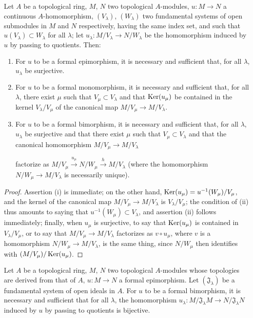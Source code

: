 \begin{proposition}[19.1.3]
\label{0.19.1.3}
Let $A$ be a topological ring, $M$, $N$ two topological $A$-modules, $u:M\to N$ a continuous $A$-homomorphism, $(V_\lambda)$, $(W_\lambda)$ two fundamental systems of open submodules in $M$ and $N$ respectively, having the same index set, and such that $u(V_\lambda)\subset W_\lambda$ for all $\lambda$;
let $u_\lambda:M/V_\lambda\to N/W_\lambda$ be the homomorphism induced by $u$ by passing to quotients.
Then:
\begin{enumerate}
  \item[(i)] For $u$ to be a formal epimorphism, it is necessary and sufficient that, for all $\lambda$, $u_\lambda$ be surjective.
  \item[(ii)] For $u$ to be a formal monomorphism, it is necessary and sufficient that, for all $\lambda$, there exist $\mu$ such that $V_\mu\subset V_\lambda$ and that $\operatorname{Ker}(u_\mu)$ be contained in the kernel $V_\lambda/V_\mu$ of the canonical map $M/V_\mu\to M/V_\lambda$.
  \item[(iii)] For $u$ to be a formal bimorphism, it is necessary and sufficient that, for all $\lambda$, $u_\lambda$ be surjective and that there exist $\mu$ such that $V_\mu\subset V_\lambda$ and that the canonical homomorphism $M/V_\mu\to M/V_\lambda$


  factorize as $M/V_\mu\xrightarrow{u_\mu}N/W_\mu\xrightarrow{h}M/V_\lambda$ (where the homomorphism $N/W_\mu\to M/V_\lambda$ is necessarily unique).
\end{enumerate}
\end{proposition}

\begin{proof}
Assertion (i) is immediate;
on the other hand, $\operatorname{Ker}(u_\mu)=u^{-1}(W_\mu)/V_\mu$, and the kernel of the canonical map $M/V_\mu\to M/V_\lambda$ is $V_\lambda/V_\mu$;
the condition of (ii) thus amounts to saying that $u^{-1}(W_\mu)\subset V_\lambda$, and assertion (ii) follows immediately;
finally, when $u_\mu$ is surjective, to say that $\operatorname{Ker}(u_\mu)$ is contained in $V_\lambda/V_\mu$, or to say that $M/V_\mu\to M/V_\lambda$ factorizes as $v\circ u_\mu$, where $v$ is a homomorphism $N/W_\mu\to M/V_\lambda$, is the same thing, since $N/W_\mu$ then identifies with $(M/V_\mu)/\operatorname{Ker}(u_\mu)$.
\end{proof}

\begin{corollary}[19.1.4]
\label{0.19.1.4}
Let $A$ be a topological ring, $M$, $N$ two topological $A$-modules whose topologies are derived from that of $A$, $u:M\to N$ a formal epimorphism.
Let $(\mathfrak{J}_\lambda)$ be a fundamental system of open ideals in $A$.
For $u$ to be a formal bimorphism, it is necessary and sufficient that for all $\lambda$, the homomorphism $u_\lambda:M/\mathfrak{J}_\lambda M\to N/\mathfrak{J}_\lambda N$ induced by $u$ by passing to quotients is bijective.
\end{corollary}

